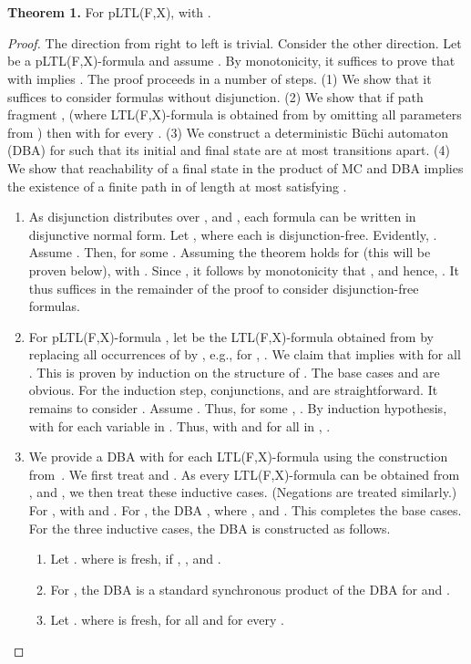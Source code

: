 \documentclass{llncs}
\begin{document}
\section{}
\textbf{Theorem 1.} For  pLTL(F,X),  with .
\begin{proof} 
The direction from right to left is trivial.
Consider the other direction.
Let  be a pLTL(F,X)-formula and assume .
By monotonicity, it suffices to prove that  with  implies .
The proof proceeds in a number of steps. 
(1) We show that it suffices to consider formulas without disjunction. 
(2) We show that if path fragment
, (where LTL(F,X)-formula  is obtained from  by omitting all parameters from ) 
then   with  for every .
(3) We construct a deterministic B\"uchi automaton (DBA)  for  such that its initial and final state are at most  transitions apart.
(4) We show that reachability of a final state in the product of MC  and DBA  implies the existence of a finite path in   
of length at most  satisfying .
\begin{enumerate}
\item
As disjunction distributes over , and , each formula can be written in disjunctive normal form.
Let , where each  is disjunction-free. 
Evidently, .
Assume .
Then,  for some .
Assuming the theorem holds for  (this will be proven below),  with 
.
Since , it follows by monotonicity that , 
and hence, .
It thus suffices in the remainder of the proof to consider disjunction-free formulas.
\item
For pLTL(F,X)-formula , let  be the LTL(F,X)-formula obtained from  by replacing all occurrences of   by , 
e.g., for , . 
We claim that  implies  with  for all . 
This is proven by induction on the structure of . 
The base cases  and  are obvious.
For the induction step, conjunctions,  and  are straightforward.
It remains to consider .
Assume . 
Thus, for some , . 
By induction hypothesis,  with  for each variable  in . 
Thus,  with  and for all  in , .
\item
We provide a DBA
 with  for each LTL(F,X)-formula  using the construction from~\cite{DBLP:journals/tocl/AlurT04}.
We first treat  and .
As every LTL(F,X)-formula can be obtained from ,  and , we then treat these inductive cases.
(Negations are treated similarly.)
For ,  with  and .   For  , the DBA , where ,  and . This completes the base cases.
For the three inductive cases, the DBA is constructed as follows.
\begin{enumerate}
\item
Let .
 where  is fresh, 
 if , , and . 
\item For , the DBA is a standard synchronous product of the DBA for  and .
\item Let .
 where  is fresh,   for all 
 and  for every .
\end{enumerate}
  

\end{enumerate}
\end{proof}
\end{document}
